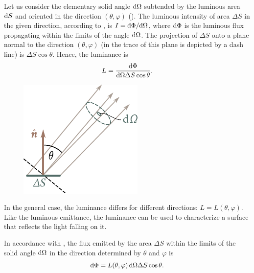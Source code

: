 Let us consider the elementary solid angle $\mathrm{d}\Omega$ subtended by the luminous area $\mathrm{d} S$ and oriented in the direction $(\theta, \varphi)$ ().
The luminous intensity of area $\Delta{S}$ in the given direction, according to , is $I = \mathrm{d}\Phi/\mathrm{d}\Omega$, where $\mathrm{d}\Phi$ is the luminous flux propagating within the limits of the angle $\mathrm{d}\Omega$.
The projection of $\Delta{S}$ onto a plane normal to the direction $(\theta, \varphi)$ (in  the trace of this plane is depicted by a dash line) is $\Delta{S}\cos\theta$.
Hence, the luminance is
\begin{equation}\label{eq:16_48}
    L = \frac{\mathrm{d}\Phi}{\mathrm{d}\Omega \Delta{S} \cos\theta}.
\end{equation}

\begin{figure}[t]
	\begin{center}
		\includegraphics[scale=1]{figures/ch_16/fig_16_5.pdf}
		\caption[]{}
		\label{fig:16_5}
	\end{center}
	\vspace{-0.8cm}
\end{figure}

In the general case, the luminance differs for different directions: $L=L(\theta,\varphi)$.
Like the luminous emittance, the luminance can be used to characterize a surface that reflects the light falling on it.

In accordance with , the flux emitted by the area $\Delta{S}$ within the limits of the solid angle $\mathrm{d}\Omega$ in the direction determined
by $\theta$ and $\varphi$ is
\begin{equation}\label{eq:16_49}
    \mathrm{d}\Phi = L(\theta,\varphi)\, \mathrm{d}\Omega \Delta{S} \cos\theta.
\end{equation}

